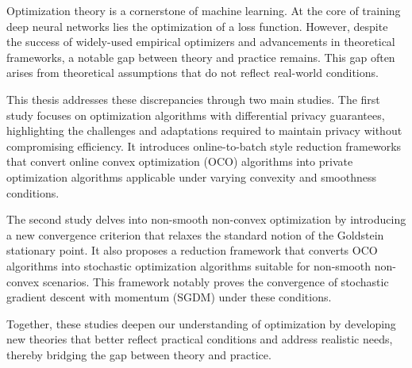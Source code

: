 
Optimization theory is a cornerstone of machine learning. At the core of training deep neural networks lies the optimization of a loss function. However, despite the success of widely-used empirical optimizers and advancements in theoretical frameworks, a notable gap between theory and practice remains. This gap often arises from theoretical assumptions that do not reflect real-world conditions.

This thesis addresses these discrepancies through two main studies. The first study focuses on optimization algorithms with differential privacy guarantees, highlighting the challenges and adaptations required to maintain privacy without compromising efficiency. It introduces online-to-batch style reduction frameworks that convert online convex optimization (OCO) algorithms into private optimization algorithms applicable under varying convexity and smoothness conditions. 

The second study delves into non-smooth non-convex optimization by introducing a new convergence criterion that relaxes the standard notion of the Goldstein stationary point. It also proposes a reduction framework that converts OCO algorithms into stochastic optimization algorithms suitable for non-smooth non-convex scenarios. This framework notably proves the convergence of stochastic gradient descent with momentum (SGDM) under these conditions. 

Together, these studies deepen our understanding of optimization by developing new theories that better reflect practical conditions and address realistic needs, thereby bridging the gap between theory and practice. 
